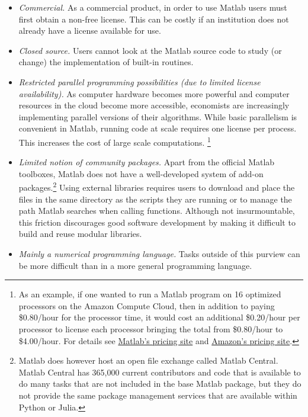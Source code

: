 \begin{itemize}

  \item \textit{Commercial.} As a commercial product, in order to use Matlab
  users must first obtain a non-free license. This can be costly if an
  institution does not already have a license available for use.

  \item \textit{Closed source.} Users cannot look at the Matlab source code to
  study (or change) the implementation of built-in routines.

  \item \textit{Restricted parallel programming possibilities (due to limited
  license availability).} As computer hardware becomes more powerful and
  computer resources in the cloud become more accessible, economists are
  increasingly implementing parallel versions of their algorithms. While basic
  parallelism is convenient in Matlab, running code at scale requires one
  license per process. This increases the cost of large scale computations.
  \footnote{ As an example, if one wanted to run a Matlab program on 16
  optimized processors on the Amazon Compute Cloud, then in addition to paying
  \$0.80/hour for the processor time, it would cost an additional \$0.20/hour
  per processor to license each processor bringing the total from \$0.80/hour
  to \$4.00/hour. For details see
  \href{https://www.mathworks.com/products/parallel-computing/parallel-computing-on-the-cloud/distriben-ec2-pricing.html}
  {Matlab's pricing site} and
  \href{https://aws.amazon.com/ec2/pricing/on-demand/} {Amazon's pricing
  site}.}

  \item \textit{Limited notion of community packages.} Apart from the official Matlab toolboxes,
  Matlab does not have a well-developed system of add-on packages.\footnote{Matlab does however host
  an open file exchange called {Matlab Central}. Matlab Central has 365,000 current contributors and
  code that is available to do many tasks that are not included in the base Matlab package, but they
  do not provide the same package management services that are available within Python or Julia.}
  Using external libraries requires users to download and place the files in the same directory as
  the scripts they are running or to manage the path Matlab searches when calling functions. Although
  not insurmountable, this friction discourages good software development by making it difficult to
  build and reuse modular libraries.

  \item \textit{Mainly a numerical programming language.} Tasks outside of this
  purview can be more difficult than in a more general programming language.

\end{itemize}

